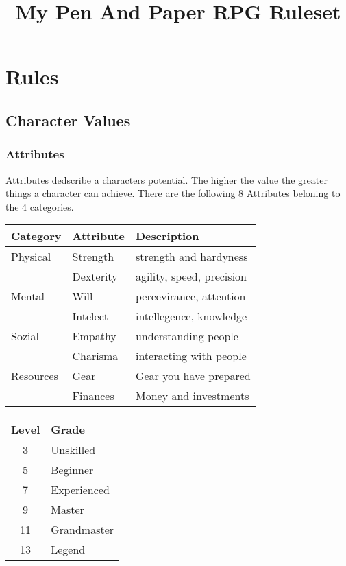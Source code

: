 \documentclass[11pt]{article}
\date{}
\title{My Pen And Paper RPG Ruleset}
\begin{document}
\maketitle
{


\section{Rules}
\label{sec:orgc622d0e}

\begin{multicols}{2}[]
\subsection{Character Values}
\label{sec:orgf39f851}
\subsubsection{Attributes}
\label{sec:org92211fd}
Attributes dedscribe a characters potential. The higher the value the greater things a character can achieve. There are the following 8 Attributes beloning to the 4 categories.

\begin{center}
\begin{tabular}{lll}
\textbf{Category} & \textbf{Attribute} & \textbf{Description}\\
\hline
Physical & Strength & strength and hardyness\\
 & Dexterity & agility, speed, precision\\
\hline
Mental & Will & percevirance, attention\\
 & Intelect & intellegence, knowledge\\
\hline
Sozial & Empathy & understanding people\\
 & Charisma & interacting with people\\
\hline
Resources & Gear & Gear you have prepared\\
 & Finances & Money and investments\\
\end{tabular}
\end{center}

\begin{center}
\begin{tabular}{c|l}
\textbf{Level} & \textbf{Grade}\\
\hline
3 & Unskilled\\
5 & Beginner\\
7 & Experienced\\
9 & Master\\
11 & Grandmaster\\
13 & Legend\\
\end{tabular}
\end{center}


\end{multicols}}
\end{document}

